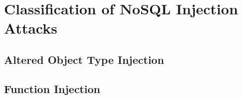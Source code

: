 \chapter{Classification of NoSQL Injection Attacks}
\label{cha:conectpion}

\section{Altered Object Type Injection}

\section{Function Injection}


